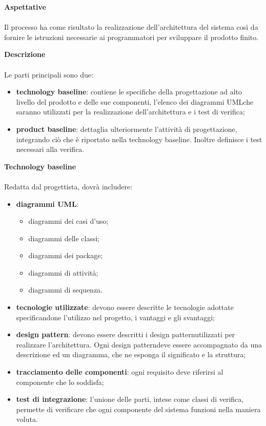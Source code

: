 			
			\noindent\textbf{Aspettative} \mbox{}\\ \mbox{}\\
			\noindent Il processo ha come risultato la realizzazione dell'architettura del sistema così 
			da fornire le istruzioni necessarie ai programmatori per sviluppare il prodotto finito.
			\newline
			
			\noindent\textbf{Descrizione}  \mbox{}\\ \mbox{}\\
			\noindent Le parti principali sono due:
				\begin{itemize}
					\item \textbf{technology baseline}: contiene le specifiche della 
						progettazione ad alto livello del prodotto e delle sue componenti, l'elenco dei 
						diagrammi UML\glosp che saranno utilizzati per la realizzazione 
						dell'architettura e i test di verifica;
					\item \textbf{product baseline}: dettaglia ulteriormente l'attività di 
						progettazione, integrando ciò che è riportato nella technology baseline. Inoltre 
						definisce i test necessari alla verifica. \newline
				\end{itemize}
			
			
			\noindent\textbf{Technology baseline} \mbox{}\\ \mbox{}\\
				
			\noindent Redatta dal progettista, dovrà includere:
				\begin{itemize}
					\item \textbf{diagrammi UML\glo}:
					\begin{itemize}
						\item diagrammi dei casi d'uso;
						\item diagrammi delle classi;
						\item diagrammi dei package;
						\item diagrammi di attività;
						\item diagrammi di sequenza.
					\end{itemize}
					\item \textbf{tecnologie utilizzate}: devono essere descritte le tecnologie 
						adottate specificandone l'utilizzo nel progetto, i vantaggi e gli svantaggi;
					\item \textbf{design pattern\glo}: devono essere descritti i design 
						pattern\glosp utilizzati per realizzare l'architettura. Ogni design 
						pattern\glosp deve essere accompagnato da una descrizione ed un diagramma, che 
						ne esponga il significato e la struttura;
					\item \textbf{tracciamento delle componenti}: ogni requisito deve riferirsi 
						al componente che lo soddisfa;
					\item \textbf{test di integrazione}: l'unione delle parti, intese come 
						classi di verifica, permette di verificare che ogni componente del sistema 
						funzioni nella maniera voluta. \newline
				\end{itemize}
						
